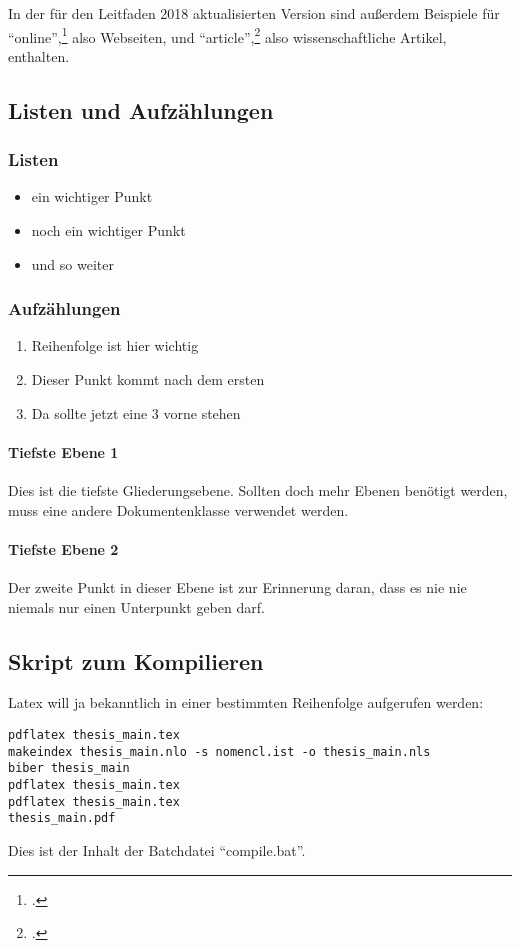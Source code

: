 In der für den Leitfaden 2018 aktualisierten Version sind außerdem Beispiele für \enquote{online},\footcite[Vgl. ][]{website:angular:aboutAngular} also Webseiten, und \enquote{article},\footcite[Vgl. ][S. 140]{Decker2009} also wissenschaftliche Artikel, enthalten.

\subsection{Listen und Aufzählungen}
\subsubsection{Listen}
\begin{itemize}
\item ein wichtiger Punkt
\item noch ein wichtiger Punkt
\item und so weiter
\end{itemize}
\subsubsection{Aufzählungen}
\begin{enumerate}
\item Reihenfolge ist hier wichtig
\item Dieser Punkt kommt nach dem ersten
\item Da sollte jetzt eine 3 vorne stehen
\end{enumerate}

\paragraph{Tiefste Ebene 1}
Dies ist die tiefste Gliederungsebene. Sollten doch mehr Ebenen benötigt werden, muss eine andere Dokumentenklasse verwendet werden.

\paragraph{Tiefste Ebene 2}
Der zweite Punkt in dieser Ebene ist zur Erinnerung daran, dass es nie nie niemals nur einen Unterpunkt geben darf.

\subsection{Skript zum Kompilieren}
Latex will ja bekanntlich in einer bestimmten Reihenfolge aufgerufen werden:
\begin{lstlisting}
pdflatex thesis_main.tex
makeindex thesis_main.nlo -s nomencl.ist -o thesis_main.nls
biber thesis_main
pdflatex thesis_main.tex
pdflatex thesis_main.tex
thesis_main.pdf
\end{lstlisting}

Dies ist der Inhalt der Batchdatei \enquote{compile.bat}.
